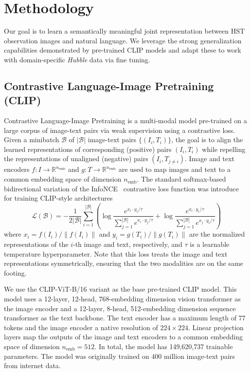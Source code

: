 \documentclass[10pt]{article} %
\newcommand{\hubble}{\emph{Hubble}\xspace}
\begin{document}
\section{Methodology}
\label{sec:methodology}

Our goal is to learn a semantically  meaningful joint representation between HST observation images and natural language.
%
We leverage the strong generalization capabilities demonstrated by pre-trained CLIP models and adapt these to work with domain-specific \hubble data via fine tuning.

\subsection{Contrastive Language-Image Pretraining (CLIP)}

Contrastive Language-Image Pretraining \citep[CLIP;][]{radford2021learning} is a multi-modal model pre-trained on a large corpus of image-text pairs via weak supervision using a contrastive loss.
%
Given a minibatch $\mathcal{B}$ of $|\mathcal{B}|$ image-text pairs $\{(I_i, T_i)\}$, the goal is to align the learned representations of corresponding (positive) pairs $(I_i, T_i)$ while repelling the representations of unaligned (negative) pairs $(I_i, T_{j\neq i})$.
%
Image and text encoders $f: I \rightarrow \mathbb R^{n_\text{emb}}$ and $g: T \rightarrow \mathbb R^{n_\text{emb}}$ are used to map images and text to a common embedding space of dimension $n_\text{emb}$.
%
The standard softmax-based bidirectional variation of the InfoNCE~\citep{oord2018representation} contrastive loss function was introduce for training CLIP-style architectures \citep{radford2021learning}
\begin{equation}
  \mathcal{L}(\mathcal{B})=-\frac{1}{2|\mathcal{B}|} \sum_{i=1}^{|\mathcal{B}|}\left(\log \frac{e^{x_i \cdot y_i / \tau}}{\sum_{j=1}^{|\mathcal{B}|} e^{x_i \cdot y_j / \tau}}+\log \frac{e^{x_i \cdot y_i / \tau}}{\sum_{j=1}^{|\mathcal{B}|} e^{x_j \cdot y_i / \tau}}\right)\label{eq:softmax_loss}
\end{equation}
where ${x}_i={f\left(I_i\right)}/{\left\|f\left(I_i\right)\right\|}$ and ${y}_i={g\left(T_i\right)}/{\left\|g\left(T_i\right)\right\|}$ are the normalized representations of the $i$-th image and text, respectively, and $\tau$ is a learnable temperature hyperparameter.
%
Note that this loss treats the image and text representations symmetrically, ensuring that the two modalities are on the same footing.

We use the CLIP-ViT-B/16 \citep{radford2021learning} variant as the base pre-trained CLIP model.
%
This model uses a 12-layer, 12-head, 768-embedding dimension vision transformer as the image encoder and a 12-layer, 8-head, 512-embedding dimension sequence transformer as the text backbone.
%
The text encoder has a maximum length of 77 tokens and the image encoder a native resolution of $224\times224$.
%
Linear projection layers map the outputs of the image and text encoders to a common embedding space of dimension $n_\text{emb}=512$.
%
In total, the model has 149,620,737 trainable parameters.
%
The model was originally trained on 400 million image-text pairs from internet data.
%
\end{document}
